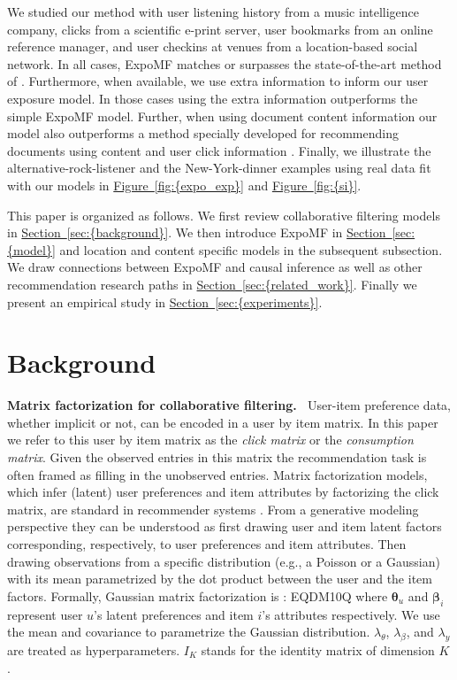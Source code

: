 \documentclass{sig-alternate-arxiv}
\begin{document}
We studied our method with user listening history from a music intelligence company, clicks from a scientific e-print server, user
bookmarks from an online reference manager, and user checkins at venues from a 
location-based social network. In all cases, ExpoMF matches or surpasses
the state-of-the-art method of \citet{hu2008collaborative}. Furthermore, when
available, we use extra information to inform our user exposure model. In those
cases using the extra information outperforms the simple ExpoMF model.
Further, when using document content information our model also
outperforms a method specially developed for recommending documents using content and user click information 
\cite{wang2011collaborative}. Finally, we illustrate the
alternative-rock-listener and the New-York-dinner examples using real data fit 
with our models in {\hyperref[fig:{expo_exp}]{Figure~\ref*{fig:{expo_exp}}}} and {\hyperref[fig:{si}]{Figure~\ref*{fig:{si}}}}. 

This paper is organized as follows. We first review collaborative filtering models in {\hyperref[sec:{background}]{Section~\ref*{sec:{background}}}}. We
then introduce ExpoMF in {\hyperref[sec:{model}]{Section~\ref*{sec:{model}}}} and location and content
specific models in the subsequent subsection. We draw connections between ExpoMF and causal inference as well as other recommendation research paths in
{\hyperref[sec:{related_work}]{Section~\ref*{sec:{related_work}}}}. Finally we present an empirical study in
{\hyperref[sec:{experiments}]{Section~\ref*{sec:{experiments}}}}.

 \section{Background}
\label{sec:background}

{\vspace{0.1in}\noindent \textbf{{Matrix factorization for collaborative filtering.} \,}} User-item preference
data, whether implicit or not, can be encoded in a user by item matrix.
In this paper we refer to this user by item matrix as the \emph{click
matrix} or the \emph{consumption matrix}. Given the observed entries in this matrix
the recommendation task is often framed as filling in the unobserved
entries.  Matrix factorization models, which infer (latent) user
preferences and item attributes by factorizing the click matrix, are standard in recommender
systems \cite{koren2009matrix}. From a generative modeling perspective they
can be understood as first drawing user and item latent factors corresponding,
respectively, to user preferences and item attributes. Then drawing 
observations from a specific distribution (e.g., a Poisson
or a Gaussian) with its mean parametrized by the dot product between the user and
the item factors. Formally, Gaussian matrix factorization is \cite{mnih2007probabilistic}: 
EQDM10Q
where $\boldsymbol\theta_u$ and $\boldsymbol\beta_i$ represent user $u$'s latent preferences and
item $i$'s attributes respectively. We use the mean and covariance to
parametrize the Gaussian distribution. $\lambda_\theta$, $\lambda_\beta$, and
$\lambda_y$ are treated as hyperparameters. $I_K$ stands for the identity
matrix of dimension $K$. 
\end{document}
